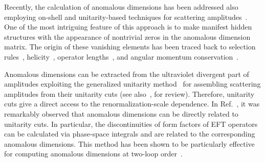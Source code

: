 \documentclass[prl,twocolumn,twoside,preprintnumbers,superscriptaddress, nofootinbib]{revtex4-2}
\begin{document}

Recently, the calculation of anomalous dimensions has been addressed also employing
on-shell and unitarity-based techniques for scattering amplitudes~\cite{Caron-Huot:2016cwu,EliasMiro:2020tdv,Baratella:2020lzz,Jiang:2020mhe,Bern:2020ikv,Baratella:2020dvw,AccettulliHuber:2021uoa,EliasMiro:2021jgu,Baratella:2022nog,Machado:2022ozb}. 
One of the most intriguing feature of this approach is to make manifest 
hidden structures with the appearance of nontrivial zeros in the anomalous dimension matrix. The origin of these vanishing elements has been traced back to selection rules~\cite{Elias-Miro:2014eia}, helicity~\cite{Cheung:2015aba}, operator lengths~\cite{Bern:2019wie}, 
and angular momentum conservation~\cite{Jiang:2020rwz}.

Anomalous dimensions can be extracted from the ultraviolet divergent 
part of amplitudes exploiting the generalized unitarity method~\cite{Bern:1994zx,Bern:1994cg,Britto:2004nc,Britto:2005ha,Britto:2006sj,Mastrolia:2009dr} for assembling scattering amplitudes from their unitarity cuts (see also~\cite{Ellis:2011cr}, for review). 
Therefore, unitarity cuts give a direct access to the renormalization-scale dependence. 
In Ref.~\cite{Caron-Huot:2016cwu}, it was remarkably observed that anomalous dimensions can be directly related to unitarity cuts. 
In particular, the discontinuities of form factors of EFT 
operators can be calculated via phase-space integrals and are related 
to the corresponding anomalous dimensions. This method has been shown to 
be particularly effective for computing anomalous dimensions at 
two-loop order~\cite{Bern:2020ikv}.
\end{document}
